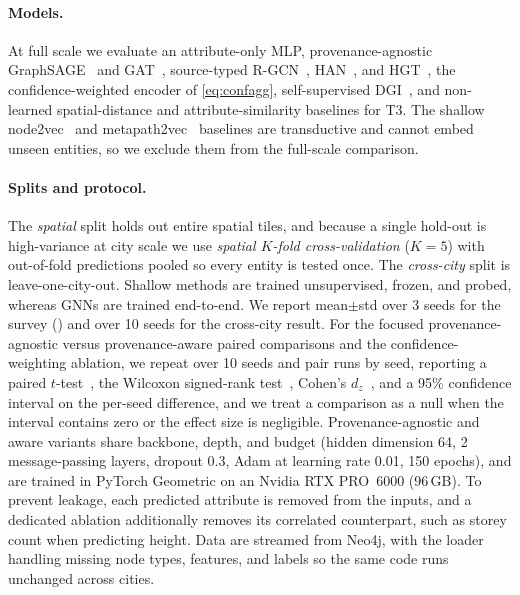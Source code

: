 \documentclass[sigconf,authordraft]{acmart}
\begin{document}
\paragraph{Models.} At full scale we evaluate an attribute-only MLP, provenance-agnostic GraphSAGE~\cite{hamilton2017graphsage} and GAT~\cite{velickovic2018gat}, source-typed R-GCN~\cite{schlichtkrull2018rgcn}, HAN~\cite{wang2019han}, and HGT~\cite{hu2020hgt}, the confidence-weighted encoder of \cref{eq:confagg}, self-supervised DGI~\cite{velickovic2019dgi}, and non-learned spatial-distance and attribute-similarity baselines for T3. The shallow node2vec~\cite{grover2016node2vec} and metapath2vec~\cite{dong2017metapath2vec} baselines are transductive and cannot embed unseen entities, so we exclude them from the full-scale comparison.

\paragraph{Splits and protocol.} The \emph{spatial} split holds out entire spatial tiles, and because a single hold-out is high-variance at city scale we use \emph{spatial $K$-fold cross-validation} ($K{=}5$) with out-of-fold predictions pooled so every entity is tested once. The \emph{cross-city} split is leave-one-city-out. Shallow methods are trained unsupervised, frozen, and probed, whereas GNNs are trained end-to-end. We report mean$\pm$std over \num{3} seeds for the survey () and over \num{10} seeds for the cross-city result. For the focused provenance-agnostic versus provenance-aware paired comparisons and the confidence-weighting ablation, we repeat over \num{10} seeds and pair runs by seed, reporting a paired $t$-test~\citep{gosset1908}, the Wilcoxon signed-rank test~\citep{wilcoxon1945}, Cohen's $d_z$~\citep{lakens2013}, and a 95\% confidence interval on the per-seed difference, and we treat a comparison as a null when the interval contains zero or the effect size is negligible. Provenance-agnostic and aware variants share backbone, depth, and budget (hidden dimension \num{64}, \num{2} message-passing layers, dropout \num{0.3}, Adam at learning rate \num{0.01}, \num{150} epochs), and are trained in PyTorch Geometric on an Nvidia RTX PRO~6000 (96\,GB). To prevent leakage, each predicted attribute is removed from the inputs, and a dedicated ablation additionally removes its correlated counterpart, such as storey count when predicting height. Data are streamed from Neo4j, with the loader handling missing node types, features, and labels so the same code runs unchanged across cities.
\end{document}
